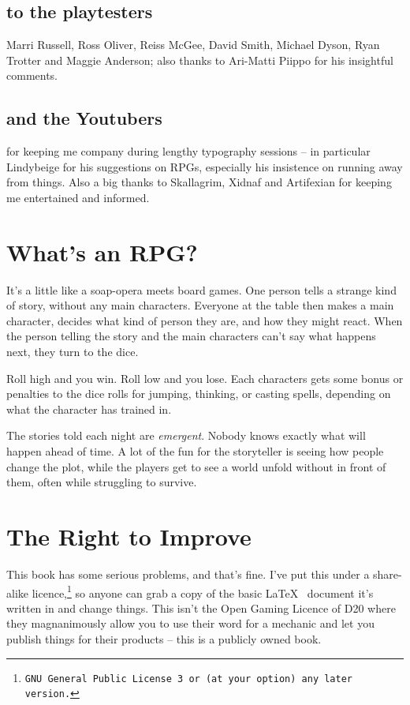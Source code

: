 \documentclass[titlepage,a4paper,openany]{book}
\begin{document}
{\begin{multicols}{2}
\subsection*{to the playtesters} Marri Russell, Ross Oliver, Reiss McGee, David Smith, Michael Dyson, Ryan Trotter and Maggie Anderson; also thanks to Ari-Matti Piippo for his insightful comments.

\subsection{and the Youtubers} for keeping me company during lengthy typography sessions -- in particular Lindybeige for his suggestions on RPGs, especially his insistence on running away from things. Also a big thanks to Skallagrim, Xidnaf and Artifexian for keeping me entertained and informed.

\section{What's an RPG?}

It's a little like a soap-opera meets board games.
One person tells a strange kind of story, without any main characters.
Everyone at the table then makes a main character, decides what kind of person they are, and how they might react.
When the person telling the story and the main characters can't say what happens next, they turn to the dice.

Roll high and you win.
Roll low and you lose.
Each characters gets some bonus or penalties to the dice rolls for jumping, thinking, or casting spells, depending on what the character has trained in.

The stories told each night are \emph{emergent}.
Nobody knows exactly what will happen ahead of time.
A lot of the fun for the storyteller is seeing how people change the plot, while the players get to see a world unfold without in front of them, often while struggling to survive.

\section*{The Right to Improve}

This book has some serious problems, and that's fine.  I've put this under a share-alike licence,\footnote{\tt GNU General Public License 3 or (at your option) any later version.} so anyone can grab a copy of the basic \LaTeX~ document it's written in and change things.  This isn't the Open Gaming Licence of D20 where they magnanimously allow you to use their word for a mechanic and let you publish things for their products -- this is a publicly owned book.


\end{multicols}}
\end{document}
